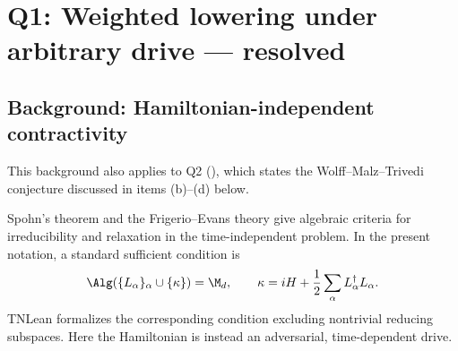 \documentclass[class=article,11pt,a4paper,crop=false]{standalone}
\begin{document}
\section{Q1: Weighted lowering under arbitrary drive --- resolved}\label{sec:q1}

\subsection{Background: Hamiltonian-independent contractivity}\label{sec:hic-background}

This background also applies to Q2
(), which states the
Wolff--Malz--Trivedi conjecture discussed in items (b)--(d) below.

Spohn's theorem \cite{Spohn1977} and the Frigerio--Evans theory
\cite{Frigerio1978,Evans1977} give algebraic criteria for irreducibility and
relaxation in the time-independent problem. In the present notation, a
standard sufficient condition is
\begin{equation}
  \Alg\!\left(\{L_\alpha\}_\alpha\cup\{\kappa\}\right)=\M_d,
  \qquad
  \kappa=iH+\frac12\sum_\alpha L_\alpha^\dagger L_\alpha.
\end{equation}
TNLean formalizes the corresponding condition excluding nontrivial reducing
subspaces. Here the Hamiltonian is instead an adversarial, time-dependent
drive.
\end{document}
